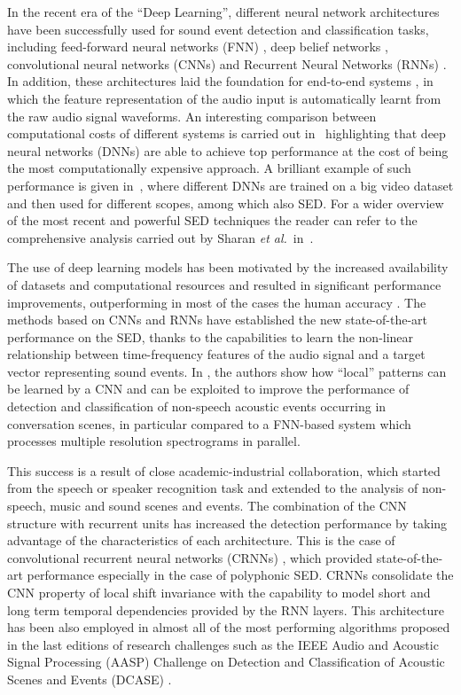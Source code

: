 In the recent era of the ``Deep Learning'', different neural network architectures have been successfully used for sound event detection and classification tasks, including feed-forward neural networks (FNN) \cite{mcloughlin2015robust}, deep belief networks \cite{mohamed2012acoustic}, convolutional neural networks (CNNs) \cite{piczak2015environmental} and Recurrent Neural Networks (RNNs) \cite{graves2013speech}. In addition, these architectures laid the foundation for end-to-end systems \cite{trigeorgis2016adieu, wu2017end}, in which the feature representation of the audio input is automatically learnt from the raw audio signal waveforms. An interesting comparison between computational costs of different systems is carried out in~\cite{sigtia2016automatic} highlighting that deep neural networks (DNNs) are able to achieve top performance at the cost of being the most computationally expensive approach. A brilliant example of such performance is given in~\cite{hershey2016cnn}, where different DNNs are trained on a big video dataset and then used for different scopes, among which also SED. For a wider overview of the most recent and powerful SED techniques the reader can refer to the comprehensive analysis carried out by Sharan \emph{et al.}\ in~\cite{sharan2016overview}.

The use of deep learning models has been motivated by the increased availability of datasets and computational resources and resulted in significant performance improvements, outperforming in most of the cases the human accuracy \cite{sailor2017unsupervised}.
The methods based on CNNs and RNNs have established the new state-of-the-art performance on the SED, thanks to the capabilities to learn the non-linear relationship between time-frequency features of the audio signal and a target vector representing sound events. In \cite{espi2015}, the authors show how ``local'' patterns can be learned by a CNN and can be exploited to improve the performance of detection and classification of non-speech acoustic events occurring in conversation scenes, in particular compared to a FNN-based system which processes multiple resolution spectrograms in parallel. 

This success is a result of close academic-industrial collaboration, which started from the speech or speaker recognition task and extended to the analysis of non-speech, music and sound scenes and events. The combination of the CNN structure with recurrent units has increased the detection performance by taking advantage of the characteristics of each architecture. This is the case of convolutional recurrent neural networks (CRNNs) \cite{cakir2017convolutional}, which provided state-of-the-art performance especially in the case of polyphonic SED. CRNNs consolidate the CNN property of local shift invariance with the capability to model short and long term temporal dependencies provided by the RNN layers. This architecture has been also employed in almost all of the most performing algorithms proposed in the last editions of research challenges such as the IEEE Audio and Acoustic Signal Processing (AASP) Challenge on  Detection and Classification of Acoustic Scenes and Events (DCASE) \cite{DCASE2017Workshop}. 

